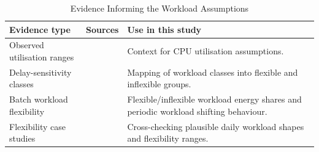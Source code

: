 \documentclass[lettersize,journal]{IEEEtran}
\providecommand{\DIFadd}[1]{{\color{blue}#1}}
\providecommand{\DIFaddbegin}{}
\providecommand{\DIFaddFL}[1]{\DIFadd{#1}}
\begin{document}
\DIFaddbegin \begin{table}[!t]
\centering
\caption{\DIFaddFL{Evidence Informing the Workload Assumptions}}
\label{tab:workload-source-summary}
\begin{scriptsize}
\begin{tabular}{p{}p{}p{}}
\toprule
\DIFaddFL{\textbf{Evidence type} }& \DIFaddFL{\textbf{Sources} }& \DIFaddFL{\textbf{Use in this study} }\\
\midrule
\DIFaddFL{Observed utilisation ranges }& \DIFaddFL{\cite{Zaloumis2022IBM,Ghia2011McKinsey} }& \DIFaddFL{Context for CPU utilisation assumptions. }\\
\DIFaddFL{Delay-sensitivity classes }& \DIFaddFL{\cite{6779441} }& \DIFaddFL{Mapping of workload classes into flexible and inflexible groups. }\\
\DIFaddFL{Batch workload flexibility }& \DIFaddFL{\cite{Cao2022ApEn} }& \DIFaddFL{Flexible/inflexible workload energy shares and periodic workload shifting behaviour. }\\
\DIFaddFL{Flexibility case studies }& \DIFaddFL{\cite{Misaghian2023TIA,Xu2023SPIE,Zhou2024IJEPES,Fu2020ApEn,Liu2012PER} }& \DIFaddFL{Cross-checking plausible daily workload shapes and flexibility ranges. }\\
\bottomrule
\end{tabular}%
\end{scriptsize}
\end{table}
\end{document}
